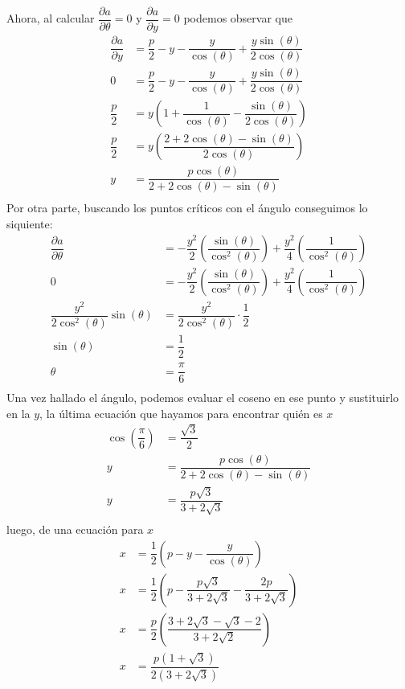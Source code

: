 \documentclass[letterpaper]{article}
\renewcommand{\d}{\partial}
\renewcommand{\*}{\cdot}
\theoremstyle{definition}
\begin{document}
Ahora, al calcular $ \dfrac{\d a}{\d \theta} = 0 $ y $ \dfrac{\d a}{\d y} = 0 $ podemos observar que 
\begin{align*}
	\dfrac{\d a}{\d y} &= \dfrac{p}{2} - y - \dfrac{y}{\cos(\theta)} + \dfrac{y \sin(\theta) }{2 \cos (\theta) }  \\
	0&= \dfrac{p}{2} - y - \dfrac{y}{\cos(\theta)} + \dfrac{y \sin(\theta) }{2 \cos (\theta) }  \\
	\dfrac{p}{2}&=  y \left( 1 + \dfrac{1}{\cos(\theta)} - \dfrac{\sin(\theta)}{2 \cos(\theta)} \right)\\
	\dfrac{p}{2}&=  y \left( \dfrac{2 + 2 \cos(\theta) - \sin(\theta)}{2\cos(\theta)} \right)\\
	y &=  \dfrac{p\cos(\theta)}{2 + 2\cos(\theta) - \sin(\theta
		)}\\
\end{align*}
Por otra parte, buscando los puntos críticos con el ángulo conseguimos lo siquiente:
\begin{align*}
	\dfrac{\d a}{\d \theta} &= - \dfrac{y^2}{2}\left( \dfrac{\sin(\theta)}{\cos^2(\theta)}\right) + \dfrac{y^2}{4}\left(  \dfrac{1}{\cos^2(\theta)} \right) \\
	0 &= - \dfrac{y^2}{2}\left( \dfrac{\sin(\theta)}{\cos^2(\theta)}\right) + \dfrac{y^2}{4}\left(  \dfrac{1}{\cos^2(\theta)} \right) \\
	\dfrac{y^2}{2\cos^2(\theta)}\sin(\theta) &= \dfrac{y^2}{2\cos^2 (\theta)}\* \dfrac{1}{2}\\
	\sin(\theta) &=\dfrac{1}{2}\\
	\theta &=\dfrac{\pi}{6}\\
\end{align*}
Una vez hallado el ángulo, podemos evaluar el coseno en ese punto y sustituirlo en la $ y $, la última ecuación que hayamos para encontrar quién es $ x $
\begin{align*}
	\cos(\dfrac{\pi}{6}) &= \dfrac{\sqrt{3}}{2}\\
	y &=  \dfrac{p\cos(\theta)}{2 + 2\cos(\theta) - \sin(\theta )}\\
	y &=  \dfrac{p\sqrt{3}}{3 + 2\sqrt{3}}\\
\end{align*}
luego, de una ecuación para $ x $
\begin{align*}
	x &= \dfrac{1}{2} \left( p - y - \dfrac{y}{\cos(\theta)} \right)\\
	x &= \dfrac{1}{2} \left( p - \dfrac{p\sqrt{3}}{3 + 2\sqrt{3}} - \dfrac{2p}{3 + 2\sqrt{3}} \right)\\
	x &= \dfrac{p}{2} \left( \dfrac{3 +2\sqrt{3} - \sqrt{3} -2}{3 +2\sqrt{2}} \right)\\
	x &= \dfrac{p(1 + \sqrt{3})}{2(3 + 2\sqrt{3})}\\
\end{align*}
\end{document}
